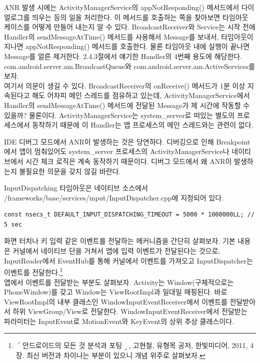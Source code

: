 ANR 발생 시에는 ActivityManagerService의 appNotResponding() 메서드에서 다이얼로그를 띄우는 등의 일을 처리한다. 
이 메서드를 호출하는 쪽을 찾아보면 타임아웃 케이스를 어떻게 만들어 내는지 알 수 있다.
BroadcastReceiver와 Service는 시작 전에 Handler의 sendMessageAtTime() 메서드를 사용해서 Message를 보내서, 타임아웃이 지나면 appNotResponding() 메서드를 호출한다. 
물론 타임아웃 내에 실행이 끝나면 Message를 얼른 제거한다. 2.4.3절에서 얘기한 Handler의 4번째 용도에 해당한다. 
com.android.server.am.BroadcastQueue와 com.android.server.am.ActiveServices를 보자.\\

여기서 의문이 생길 수 있다. BroadcastReceiver의 onReceive() 메서드가 1분 이상 지속된다고 해도 어차피 메인 스레드를 점유하고 있는데, ActivityManagerService에서 Handler의 sendMessageAtTime() 메서드에 전달된 Message가 제 시간에 작동할 수 있을까? 
물론이다. ActivityManagerService는 system\_server로 떠있는 별도의 프로세스에서 동작하기 때문에 이 Handler는 앱 프로세스의 메인 스레드와는 관련이 없다.\\

\colorbox{tearose}{\parbox[t]{15cm}{
IDE 디버그 모드에서 ANR이 발생하는 것은 당연하다. 
디버깅으로 인해 Breakpoint에서 앱이 멈춰있어도 system\_server 프로세스의 ActivityManagerService나 네이티브에서 시간 체크 로직은 계속 동작하기 때문이다. 
디버그 모드에서 왜 ANR이 발생하는지 불필요한 의문을 갖지 않길 바란다.
}}\newline\newline

InputDispatching 타임아웃은 네이티브 소스에서 /frameworks/base/services/input/InputDispatcher.cpp에 지정되어 있다.
\begin{lstlisting}[frame=single] 
	const nsecs_t DEFAULT_INPUT_DISPATCHING_TIMEOUT = 5000 * 1000000LL; // 5 sec
\end{lstlisting}
화면 터치나 키 입력 같은 이벤트를 전달하는 메커니즘을 간단히 살펴보자.
기본 내용은 커널에서 네이티브 단을 거쳐서 앱에 입력 이벤트가 전달된다는 것으로,
InputReader에서 EventHub를 통해 커널에서 이벤트를 가져오고 InputDispatcher는 이벤트를 전달한다.\footnote{$\ulcorner$안드로이드의 모든 것 분석과 포팅$\lrcorner$, 고현철, 유형목 공저, 한빛미디어, 2011, 4장. 최신 버전과 차이나는 부분이 있으니 개념 위주로 살펴보자.}\\

앱에서 이벤트를 전달받는 부분도 살펴보자. Activity는 Window(구체적으로는 PhoneWindow)를 갖고 Window는 ViewRootImpl과 일대일 매핑된다. 
바로 ViewRootImpl의 내부 클래스인 WindowInputEventReceiver에서 이벤트를 전달받아서 하위 ViewGroup/View로 전달한다. 
WindowInputEventReceiver에서 전달받는 파라미터는 InputEvent로 MotionEvent와 KeyEvent의 상위 추상 클래스이다.\\

